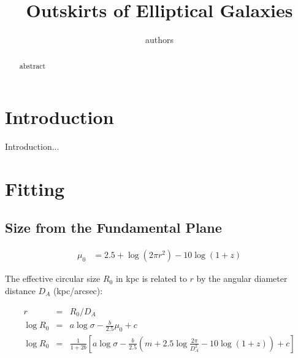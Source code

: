 \documentclass{aastex}
\begin{document}
\title{Outskirts of Elliptical Galaxies}
\author{authors}


\begin{abstract}
    abstract    
\end{abstract}    


\section{Introduction}
Introduction...


\section{Fitting}
\subsection{Size from the Fundamental Plane}

\begin{eqnarray}
       \mu_0 &= 2.5 + \log(2 \pi r^2) - 10 \log(1+z)
   \end{eqnarray}   

The effective circular size $R_0$ in kpc is related to $r$ by
the angular diameter distance $D_A$ (kpc/arcsec):

\begin{eqnarray}
    \nonumber r &=& R_0 / D_A \\
    \log R_0 &=& a \log \sigma - \frac{b}{2.5} \mu_0 + c \\
    \nonumber \log R_0 &=& \frac{1}{1 + 2 b} \left[ a\log \sigma
        - \frac{b}{2.5} \left(m + 2.5\log \frac{2\pi}{D_A^2} - 10 \log (1+z)\right)
        + c \right]
\end{eqnarray}
\end{document}
